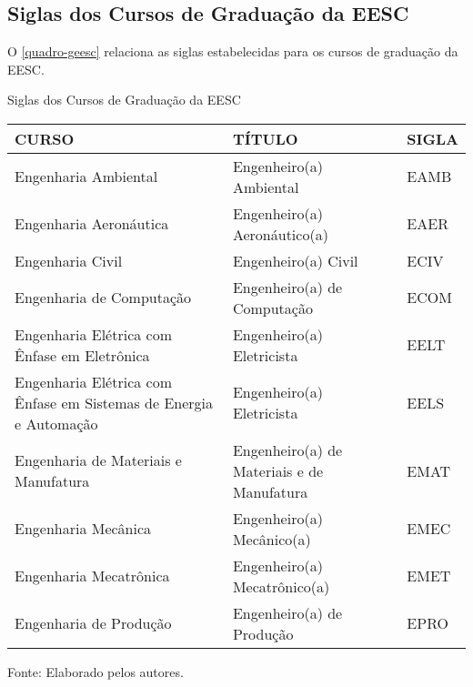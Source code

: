 \begin{apendicesenv}
\chapter{Siglas dos Cursos de Graduação da EESC}
O \autoref{quadro-geesc} relaciona as siglas estabelecidas para os cursos de graduação da EESC.
\begin{quadro}[htb]
	\ABNTEXfontereduzida
	\caption[Siglas dos Cursos de Graduação da EESC]{Siglas dos Cursos de Graduação da EESC}
	\label{quadro-geesc}
	\begin{tabular}{|p{6.5cm}|p{6.5cm}|p{1.75cm}|}
		\hline
		\textbf{CURSO} & \textbf{TÍTULO} &  \textbf{SIGLA}  \\
		\hline
		Engenharia Ambiental & Engenheiro(a) Ambiental & EAMB\\
		Engenharia Aeronáutica & Engenheiro(a) Aeronáutico(a) & EAER\\
		Engenharia Civil & Engenheiro(a) Civil & ECIV\\
		Engenharia de Computação & Engenheiro(a) de Computação & ECOM\\
	    Engenharia Elétrica com Ênfase em Eletrônica & Engenheiro(a) Eletricista & EELT\\
	    Engenharia Elétrica com Ênfase em Sistemas de Energia e Automação & Engenheiro(a) Eletricista & EELS\\
		Engenharia de Materiais e Manufatura & Engenheiro(a) de Materiais e de Manufatura & EMAT\\
		Engenharia Mecânica & Engenheiro(a) Mecânico(a) & EMEC\\
		Engenharia Mecatrônica & Engenheiro(a) Mecatrônico(a) & EMET\\
		Engenharia de Produção & Engenheiro(a) de Produção & EPRO\\
		\hline
		
	\end{tabular}
	\begin{flushleft}
		Fonte: Elaborado pelos autores.\
	\end{flushleft}
\end{quadro}


\end{apendicesenv}
